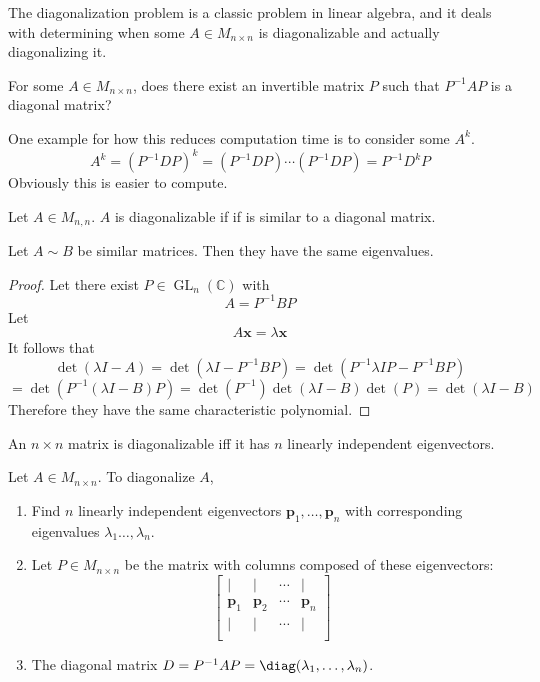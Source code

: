 The diagonalization problem is a classic problem in linear algebra, and it deals with determining when some \(A\in M_{n\times n}\) is diagonalizable and actually diagonalizing it.
\begin{solution}
    For some \(A\in M_{n\times n}\), does there exist an invertible matrix \(P\) such that \(P ^{-1} AP\) is a diagonal matrix?
\end{solution}
One example for how this reduces computation time is to consider some \(A^k\).
\[
    A^k = \left( P ^{-1} DP \right)^k = \left( P ^{-1} DP \right)\cdots\left( P ^{-1} DP \right)= P ^{-1} D^k P
\]
Obviously this is easier to compute.
\begin{definition}
    Let \(A\in M_{n,n}\). \(A\) is diagonalizable if if is similar to a diagonal matrix.
\end{definition}
\begin{theorem}
    Let \(A\sim B\) be similar matrices. Then they have the same eigenvalues.
\end{theorem}
\begin{proof}
    Let there exist \(P\in \operatorname{GL}_n(\mathbb{C} ) \) with
    \[
        A = P ^{-1} BP
    \]
    Let
    \[
        A \mathbf{x} =\lambda \mathbf{x} 
    \]
    It follows that
    \[
        \det (\lambda I - A)=\det \left(\lambda I - P ^{-1} BP\right)=\det \left( P ^{-1} \lambda IP - P ^{-1} BP \right)
    \]
    \[
        =\det \left( P ^{-1} (\lambda I - B)P \right) =\det (P ^{-1} )\det (\lambda I - B)\det (P) = \det (\lambda I-B)
    \]
    Therefore they have the same characteristic polynomial.
\end{proof}
\begin{theorem}
    An \(n\times n\) matrix is diagonalizable iff it has \(n\) linearly independent eigenvectors.
\end{theorem}
\begin{theorem}
    Let \(A\in M_{n\times n}\). To diagonalize \(A\),
    \begin{enumerate}
        \item Find \(n\) linearly independent eigenvectors \(\mathbf{p}_1,\ldots,\mathbf{p} _n\) with corresponding eigenvalues \(\lambda _1\ldots,\lambda _n\).
        \item Let \(P\in M_{n\times n}\) be the matrix with columns composed of these eigenvectors:
        \[
            \begin{bmatrix}
                \mid  & \mid  &\cdots  & \mid    \\
                 \mathbf{p} _1&\mathbf{p} _2  &\cdots  &\mathbf{p} _n   \\
                \mid  & \mid  & \cdots  & \mid   \\
            \end{bmatrix}
        \]
        \item The diagonal matrix \(D=P ^{-1} AP=\diag (\lambda _1,\ldots,\lambda _n)\).
    \end{enumerate}
\end{theorem}
